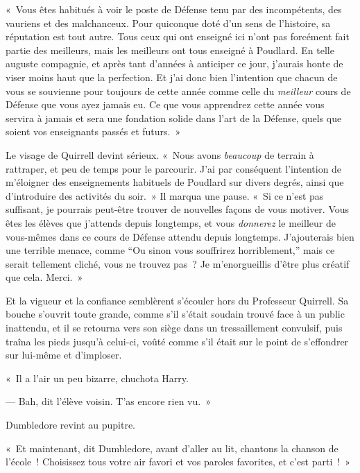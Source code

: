 «~Vous êtes habitués à voir le poste de Défense tenu par des incompétents, des vauriens et des malchanceux.
Pour quiconque doté d'un sens de l'histoire, sa réputation est tout autre.
Tous ceux qui ont enseigné ici n'ont pas forcément fait partie des meilleurs, mais les meilleurs ont tous enseigné à Poudlard.
En telle auguste compagnie, et après tant d'années à anticiper ce jour, j'aurais honte de viser moins haut que la perfection.
Et j'ai donc bien l'intention que chacun de vous se souvienne pour toujours de cette année comme celle du \emph{meilleur} cours de Défense que vous ayez jamais eu.
Ce que vous apprendrez cette année vous servira à jamais et sera une fondation solide dans l'art de la Défense, quels que soient vos enseignants passés et futurs.~»

Le visage de Quirrell devint sérieux.
«~Nous avons \emph{beaucoup} de terrain à rattraper, et peu de temps pour le parcourir.
J'ai par conséquent l'intention de m'éloigner des enseignements habituels de Poudlard sur divers degrés, ainsi que d'introduire des activités du soir.~» 
Il marqua une pause.
«~Si ce n'est pas suffisant, je pourrais peut-être trouver de nouvelles façons de vous motiver.
Vous êtes les élèves que j'attends depuis longtemps, et vous \emph{donnerez} le meilleur de vous-mêmes dans ce cours de Défense attendu depuis longtemps.
J'ajouterais bien une terrible menace, comme “Ou sinon vous souffrirez horriblement,” mais ce serait tellement cliché, vous ne trouvez pas~?
Je m'enorgueillis d'être plus créatif que cela. Merci.~»

Et la vigueur et la confiance semblèrent s'écouler hors du Professeur Quirrell.
Sa bouche s'ouvrit toute grande, comme s'il s'était soudain trouvé face à un public inattendu, et il se retourna vers son siège dans un tressaillement convulsif, puis traîna les pieds jusqu'à celui-ci, voûté comme s'il était sur le point de s'effondrer sur lui-même et d'imploser.

«~Il a l'air un peu bizarre, chuchota Harry.

--- Bah, dit l'élève voisin. T'as encore rien vu.~»

Dumbledore revint au pupitre.

«~Et maintenant, dit Dumbledore, avant d'aller au lit, chantons la chanson de l'école~!
Choisissez tous votre air favori et vos paroles favorites, et c'est parti~!~»

